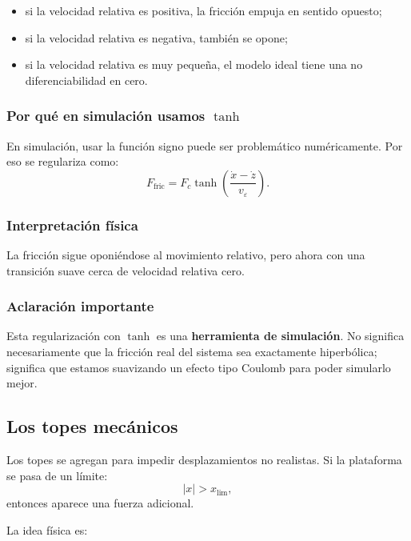 \documentclass[11pt]{article}
\begin{document}
\begin{itemize}[leftmargin=1.2cm]
\item si la velocidad relativa es positiva, la fricci\'on empuja en sentido opuesto;
\item si la velocidad relativa es negativa, tambi\'en se opone;
\item si la velocidad relativa es muy peque\~na, el modelo ideal tiene una no diferenciabilidad en cero.
\end{itemize}

\subsubsection{Por qu\'e en simulaci\'on usamos $\tanh$}

En simulaci\'on, usar la funci\'on signo puede ser problem\'atico num\'ericamente. Por eso se regulariza como:
\begin{equation}
F_{\text{fric}} =
F_c\tanh\left(\frac{\dot{x}-\dot{z}}{v_\varepsilon}\right).
\label{eq:tanh}
\end{equation}

\subsubsection{Interpretaci\'on f\'isica}

La fricci\'on sigue oponi\'endose al movimiento relativo, pero ahora con una transici\'on suave cerca de velocidad relativa cero.

\subsubsection{Aclaraci\'on importante}

Esta regularizaci\'on con $\tanh$ es una \textbf{herramienta de simulaci\'on}. No significa necesariamente que la fricci\'on real del sistema sea exactamente hiperb\'olica; significa que estamos suavizando un efecto tipo Coulomb para poder simularlo mejor.

\subsection{Los topes mec\'anicos}

Los topes se agregan para impedir desplazamientos no realistas. Si la plataforma se pasa de un l\'imite:
\[
|x| > x_{\text{lim}},
\]
entonces aparece una fuerza adicional.

La idea f\'isica es:
\end{document}
